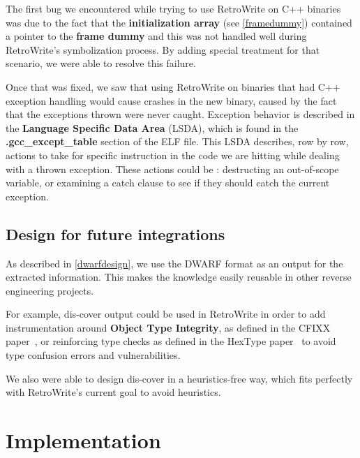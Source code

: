 \documentclass[a4paper,11pt,oneside]{report}
\begin{document}
The first bug we encountered while trying to use RetroWrite on C++ binaries
was due to the fact that the \textbf{initialization array} (see
\autoref{framedummy}) contained a pointer to the \textbf{frame dummy} and this
was not handled well during RetroWrite's symbolization process.
By adding special treatment for that scenario, we were able to resolve this
failure.

Once that was fixed, we saw that using RetroWrite on binaries that had C++
exception handling would cause crashes in the new binary, caused by the fact
that the exceptions thrown were never caught.
Exception behavior is described in the \textbf{Language Specific Data Area}
(LSDA), which is found in the \textbf{.gcc\_except\_table} section of the ELF
file.
This LSDA describes, row by row, actions to take for specific instruction in
the code we are hitting while dealing with a thrown exception. These actions
could be : destructing an out-of-scope variable, or examining a catch clause
to see if they should catch the current exception.

\section{Design for future integrations}

As described in \autoref{dwarfdesign}, we use the DWARF format as an output
for the extracted information. This makes the knowledge easily reusable in
other reverse engineering projects.

For example, dis-cover output could be used in RetroWrite in order to add
instrumentation around \textbf{Object Type Integrity}, as defined in the CFIXX
paper~\cite{cfixx}, or reinforcing type checks as defined in the HexType
paper~\cite{hextype} to avoid type confusion errors and vulnerabilities.

We also were able to design dis-cover in a heuristics-free way, which fits
perfectly with RetroWrite's current goal to avoid heuristics.


\chapter{Implementation}

\end{document}
